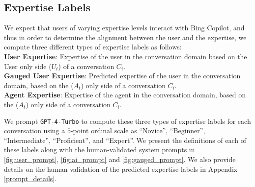 \subsection{Expertise Labels}\label{exp_label}
We expect that users of varying expertise levels interact with Bing Copilot, and thus in order to determine the alignment between the user and the  expertise, we compute three different types of expertise labels as follows: \\
\textbf{User Expertise}: Expertise of the user in the conversation domain based on the User only side ($U_t$) of a conversation $C_{i}$. \\
\textbf{Gauged User Expertise}: Predicted expertise of the user in the conversation domain, based on the  ($A_t$) only side of a conversation $C_{i}$. \\
\textbf{Agent Expertise}: Expertise of the agent in the conversation domain, based on the  ($A_t$) only side of a conversation $C_{i}$.

We prompt \texttt{GPT-4-Turbo} \cite{openai2023gpt4} to compute these three types of expertise labels for each conversation using a $5$-point ordinal scale as ``Novice'', ``Beginner'', ``Intermediate'', ``Proficient'', and ``Expert''. We present the definitions of each of these labels along with the human-validated system prompts in \autoref{fig:user_prompt}, \autoref{fig:ai_prompt} and \autoref{fig:gauged_prompt}. We also provide details on the human validation of the predicted expertise labels in Appendix \ref{prompt_details}.

